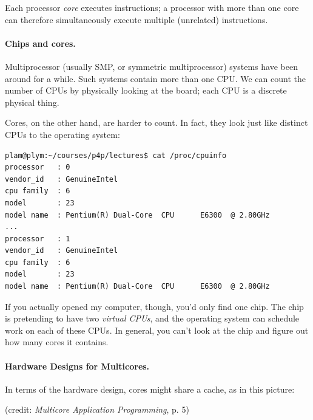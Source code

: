 Each processor \emph{core} executes instructions; a processor with
more than one core can therefore simultaneously execute multiple
(unrelated) instructions. 

\paragraph{Chips and cores.} Multiprocessor (usually SMP, or symmetric
multiprocessor) systems have been around for a while. Such systems
contain more than one CPU. We can count the number of CPUs by
physically looking at the board; each CPU is a discrete physical thing.

Cores, on the other hand, are harder to count. In fact, they look just
like distinct CPUs to the operating system:

{\scriptsize \begin{verbatim}
plam@plym:~/courses/p4p/lectures$ cat /proc/cpuinfo
processor	: 0
vendor_id	: GenuineIntel
cpu family	: 6
model		: 23
model name	: Pentium(R) Dual-Core  CPU      E6300  @ 2.80GHz
...
processor	: 1
vendor_id	: GenuineIntel
cpu family	: 6
model		: 23
model name	: Pentium(R) Dual-Core  CPU      E6300  @ 2.80GHz
\end{verbatim}
}
\vspace*{-1em}
If you actually opened my computer, though, you'd only find one chip.
The chip is pretending to have two \emph{virtual CPUs}, and the
operating system can schedule work on each of these CPUs. In general,
you can't look at the chip and figure out how many cores it contains.

\vspace*{-1em}
\paragraph{Hardware Designs for Multicores.}
In terms of the hardware design, cores might share a cache, as in this picture:

\vspace*{-1em}
\begin{center}
\end{center}
\vspace*{-1em}
\hfill (credit: \emph{Multicore Application Programming}, p. 5)

